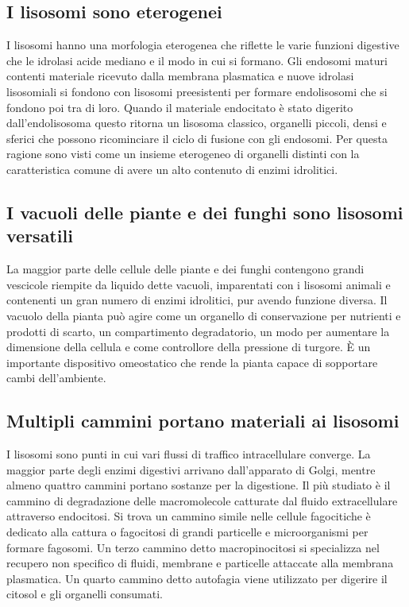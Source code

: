 \subsection{I lisosomi sono eterogenei}
I lisosomi hanno una morfologia eterogenea che riflette le varie funzioni digestive che le idrolasi acide mediano e il modo in cui si formano. Gli endosomi maturi contenti materiale
ricevuto dalla membrana plasmatica e nuove idrolasi lisosomiali si fondono con lisosomi preesistenti per formare endolisosomi che si fondono poi tra di loro. Quando il materiale 
endocitato \`e stato digerito dall'endolisosoma questo ritorna un lisosoma classico, organelli piccoli, densi e sferici che possono ricominciare il ciclo di fusione con gli endosomi.
Per questa ragione sono visti come un insieme eterogeneo di organelli distinti con la caratteristica comune di avere un alto contenuto di enzimi idrolitici.
\subsection{I vacuoli delle piante e dei funghi sono lisosomi versatili}
La maggior parte delle cellule delle piante e dei funghi contengono grandi vescicole riempite da liquido dette vacuoli, imparentati con i lisosomi animali e contenenti un gran numero di
enzimi idrolitici, pur avendo funzione diversa. Il vacuolo della pianta pu\`o agire come un organello di conservazione per nutrienti e prodotti di scarto, un compartimento degradatorio,
un modo per aumentare la dimensione della cellula e come controllore della pressione di turgore. \`E un importante dispositivo omeostatico che rende la pianta capace di sopportare 
cambi dell'ambiente.
\subsection{Multipli cammini portano materiali ai lisosomi}
I lisosomi sono punti in cui vari flussi di traffico intracellulare converge. La maggior parte degli enzimi digestivi arrivano dall'apparato di Golgi, mentre almeno quattro cammini 
portano sostanze per la digestione. Il pi\`u studiato \`e il cammino di degradazione delle macromolecole catturate dal fluido extracellulare attraverso endocitosi. Si trova un
cammino simile nelle cellule fagocitiche \`e dedicato alla cattura  o fagocitosi di grandi particelle e microorganismi per formare fagosomi. Un terzo cammino detto macropinocitosi si
specializza nel recupero non specifico di fluidi, membrane e particelle attaccate alla membrana plasmatica. Un quarto cammino detto autofagia viene utilizzato per digerire il citosol
e gli organelli consumati. 
